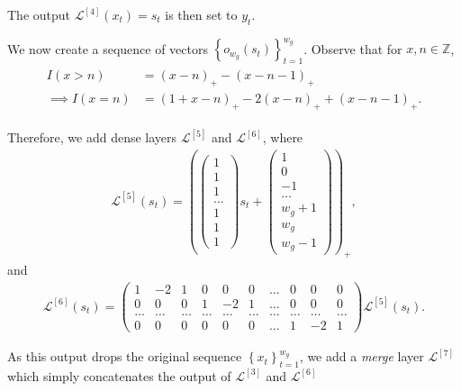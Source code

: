 \documentclass{somasmsc}
\begin{document}
The output $\mathcal{L}^{\left[4\right]}\left(x_t\right) = s_t$ is then set to $y_t$.

We now create a sequence of vectors $\left\{o_{w_g}(s_t)\right\}_{t=1}^{w_g}$. Observe that for $x,n \in \mathbb{Z}$,
\begin{align}\label{letters:eq1}
\begin{split}
I(x > n) &= \left(x - n\right)_+ - \left(x - n - 1\right)_+ \\
\implies I(x = n) &= \left(1 + x - n\right)_+ - 2\left(x - n\right)_+ + \left(x - n - 1\right)_+.
\end{split}
\end{align}

Therefore, we add dense layers $\mathcal{L}^{\left[5\right]}$ and $\mathcal{L}^{\left[6\right]}$, where
\begin{align*}
\mathcal{L}^{\left[5\right]}\left(s_t\right) = \left(
\begin{pmatrix}
    1 \\
    1 \\
    1 \\
    \dots \\
    1 \\
    1 \\
    1
\end{pmatrix}
s_t +
\begin{pmatrix}
    1 \\
    0 \\
    -1 \\
    \dots \\
    w_g + 1 \\
    w_g \\
    w_g - 1
\end{pmatrix}\right)_+,
\end{align*}
and
\begin{align*}
\mathcal{L}^{\left[6\right]}\left(s_t\right) =
\begin{pmatrix}
    1 & -2 & 1 & 0 & 0 & 0 & \dots & 0 & 0 & 0 \\
    0 & 0 & 0 & 1 & -2 & 1 & \dots & 0 & 0 & 0 \\
    \dots & \dots & \dots & \dots & \dots & \dots & \dots & \dots & \dots & \dots \\
    0 & 0 & 0 & 0 & 0 & 0 &\dots & 1 & -2 & 1
\end{pmatrix}
\mathcal{L}^{\left[5\right]}\left(s_t\right).
\end{align*}

As this output drops the original sequence $\left\{x_t\right\}_{t=1}^{w_g}$, we add a \textit{merge} layer $\mathcal{L}^{\left[7\right]}$ which simply concatenates the output of $\mathcal{L}^{\left[3\right]}$ and $\mathcal{L}^{\left[6\right]}$
\end{document}
